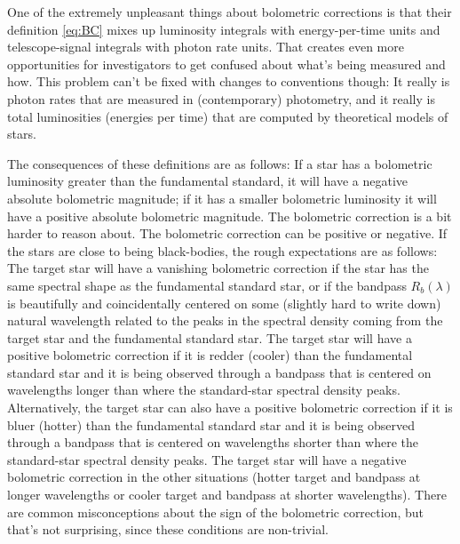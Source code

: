 \documentclass[10pt]{article}
\begin{document}
One of the extremely unpleasant things about bolometric corrections is that their definition \eqref{eq:BC} mixes up luminosity integrals with energy-per-time units and telescope-signal integrals with photon rate units.
That creates even more opportunities for investigators to get confused about what's being measured and how.
This problem can't be fixed with changes to conventions though:
It really is photon rates that are measured in (contemporary) photometry, and it really is total luminosities (energies per time) that are computed by theoretical models of stars.

The consequences of these definitions are as follows:
If a star has a bolometric luminosity greater than the fundamental standard, it will have a negative absolute bolometric magnitude; if it has a smaller bolometric luminosity it will have a positive absolute bolometric magnitude.
The bolometric correction is a bit harder to reason about.
The bolometric correction can be positive or negative.
If the stars are close to being black-bodies, the rough expectations are as follows:
The target star will have a vanishing bolometric correction if the star has the same spectral shape as the fundamental standard star, or if the bandpass $R_b(\lambda)$ is beautifully and coincidentally centered on some (slightly hard to write down) natural wavelength related to the peaks in the spectral density coming from the target star and the fundamental standard star.
The target star will have a positive bolometric correction if it is redder (cooler) than the fundamental standard star and it is being observed through a bandpass that is centered on wavelengths longer than where the standard-star spectral density peaks.
Alternatively, the target star can also have a positive bolometric correction if it is bluer (hotter) than the fundamental standard star and it is being observed through a bandpass that is centered on wavelengths shorter than where the standard-star spectral density peaks.
The target star will have a negative bolometric correction in the other situations (hotter target and bandpass at longer wavelengths or cooler target and bandpass at shorter wavelengths).
There are common misconceptions about the sign of the bolometric correction, but that's not surprising, since these conditions are non-trivial.
\end{document}
